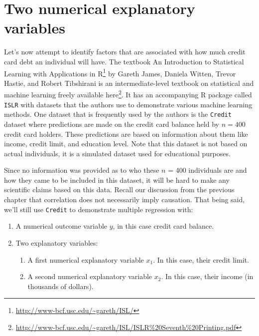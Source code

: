 \documentclass[12pt,]{krantz}
\providecommand{\tightlist}{%
  \setlength{\itemsep}{0pt}\setlength{\parskip}{0pt}}
\renewcommand{\href}[2]{#2\footnote{\url{#1}}}
\theoremstyle{definition}
\theoremstyle{definition}
\theoremstyle{definition}
\theoremstyle{remark}
\begin{document}
\section{Two numerical explanatory variables}\label{model3}

Let's now attempt to identify factors that are associated with how much
credit card debt an individual will have. The textbook
\href{http://www-bcf.usc.edu/~gareth/ISL/}{An Introduction to
Statistical Learning with Applications in R} by Gareth James, Daniela
Witten, Trevor Hastie, and Robert Tibshirani is an intermediate-level
textbook on statistical and machine learning freely available
\href{http://www-bcf.usc.edu/~gareth/ISL/ISLR\%20Seventh\%20Printing.pdf}{here}.
It has an accompanying R package called \texttt{ISLR} with datasets that
the authors use to demonstrate various machine learning methods. One
dataset that is frequently used by the authors is the \texttt{Credit}
dataset where predictions are made on the credit card balance held by
\(n = 400\) credit card holders. These predictions are based on
information about them like income, credit limit, and education level.
Note that this dataset is not based on actual individuals, it is a
simulated dataset used for educational purposes.

Since no information was provided as to who these \(n\) = 400
individuals are and how they came to be included in this dataset, it
will be hard to make any scientific claims based on this data. Recall
our discussion from the previous chapter that correlation does not
necessarily imply causation. That being said, we'll still use
\texttt{Credit} to demonstrate multiple regression with:

\begin{enumerate}
\def\labelenumi{\arabic{enumi}.}
\tightlist
\item
  A numerical outcome variable \(y\), in this case credit card balance.
\item
  Two explanatory variables:

  \begin{enumerate}
  \def\labelenumii{\arabic{enumii}.}
  \tightlist
  \item
    A first numerical explanatory variable \(x_1\). In this case, their
    credit limit.
  \item
    A second numerical explanatory variable \(x_2\). In this case, their
    income (in thousands of dollars).
  \end{enumerate}
\end{enumerate}
\end{document}
